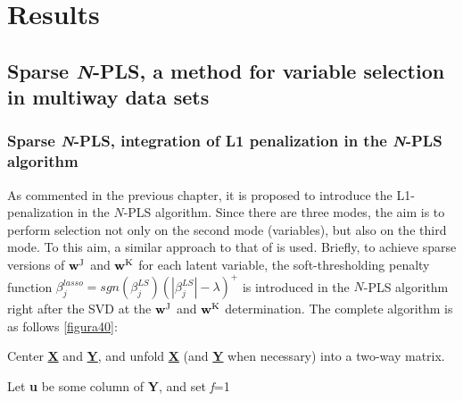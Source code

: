 \part{Results}
\chapter[Sparse \textit{N}-PLS, a method for variable selection in multiway data sets]{Sparse \textit{N}-PLS, a method for variable selection in multiway data sets}



\section{Sparse \textit{N}-PLS, integration of L1 penalization in the \textit{N}-PLS algorithm}
\label{NPLSpenalization}
As commented in the previous chapter, it is proposed to introduce the L1-penalization in the $N$-PLS algorithm. Since there are three modes, the aim is to perform selection not only on the second mode (variables), but also on the third mode. To this aim, a similar approach to that of \cite{le2008sparse} is used. Briefly, to achieve sparse versions of $\textbf{\text{w}}^\text{J}$ and $\textbf{\text{w}}^\text{K}$ for each latent variable, the soft-thresholding penalty function $\beta_j^{lasso}=sgn(\beta_j^{LS})(|\beta_j^{LS}|-\lambda)^+$ is introduced in the $N$-PLS algorithm right after the SVD at the $\textbf{\text{w}}^\text{J}$ and $\textbf{\text{w}}^\text{K}$ determination. The complete algorithm is as follows \autoref{figura40}:


\vspace{20pt}
Center \textbf{\underline{X}} and \textbf{\underline{Y}}, and unfold \textbf{\underline{X}} (and \textbf{\underline{Y}} when necessary) into a two-way matrix.

Let \textbf{u} be some column of \textbf{Y}, and set \textit{f}=1


